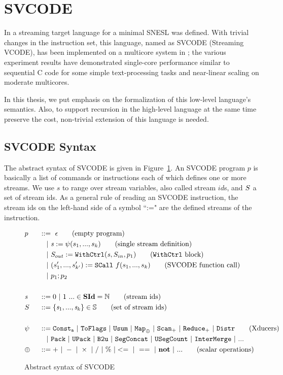 \section{SVCODE}
In \cite{Fmaster} a streaming target language for a minimal SNESL was defined.
With trivial changes in the instruction set, this language, named as SVCODE (Streaming VCODE), has been implemented on a multicore system in \cite{MF16}; the various experiment results
have demonstrated single-core performance similar to sequential C code for some simple 
text-processing tasks and near-linear scaling on moderate multicores.

In this thesis, we put emphasis on the formalization of this low-level language's semantics.
Also, to support recursion in the high-level language at the same time preserve the cost, non-trivial extension of this language is needed. 

\subsection{SVCODE Syntax}

The abstract syntax of SVCODE is given in Figure~\ref{fig-svcode1-gram}.
An SVCODE program $p$ is basically a list of commands or instructions each of which defines one or more streams. 
We use $s$ to range over stream variables, also called stream $id$s, and $\S$ a set of stream ids.
As a general rule of reading an SVCODE instruction, the stream ids on the left-hand side of a symbol ``:=" are the defined streams of the instruction.


\begin{figure}[h] \large
	\begin{alignat*}{2}
	&p  && :: = \ \epsilon \tag{empty program}\\ 
	&   && \quad | \ \sdef{\s}{\psi(s_1,...,s_k)}  \tag{single stream definition}\\
	&   && \quad | \ \withctrl{\s}{p_1}{\Sin}{\Sout}  \tag{\wc block}\\
	&   && \quad | \ \scall{f}{s_1,...,s_k}{(s_1',...,s_{k'}')} \tag{SVCODE function call}\\
	&   && \quad | \ p_1;p_2  \\
	\\
	&\s && ::= 0 \ | \ 1 \ ... \in \SId  = \mathbb{N}   \tag{stream ids}\\
	&  \S && ::= \{\s_1,..., \s_k\} \in \sset  \tag{set of stream ids}\\
	\\
	& \psi \ && ::= \consta{a} \ | \ \toflag  
	\ | \ \usum \ | \ \map{\oplus} \ | \ \genscan_{+} \ | \ \genreduce_{+} \ | \ \distr  \tag{Xducers}  \\
    &   && \quad | \ \pack \ | \ \upack \ | \ \bu \ | \ \segconcat \ | \ \usegcount \ | \ \intermerge \ | \ ...  \\
    & \oplus  \ && :: = + \ | \ - \ | \ \times \ |  \  / \ | \ \% \ | <= \ | \ == \ | \  \*{not} \ | \ ... \tag{scalar operations}
	\end{alignat*}
	\caption{Abstract syntax of SVCODE \label{fig-svcode1-gram}}
\end{figure}


